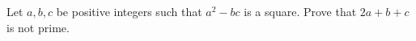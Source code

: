 Let $a,b,c$ be positive integers such that $a^2 - bc$ is a square. Prove that $2a + b + c$ is not prime.